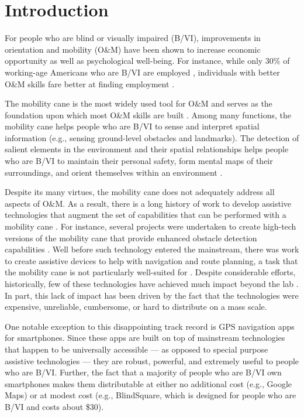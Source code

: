 \documentclass[chi_draft]{sigchi}
\newcommand{\BVI}{B/VI\xspace}
\newcommand{\OM}{O\&M\xspace}
\begin{document}
\section{Introduction}
For people who are blind or visually impaired (\BVI), improvements in orientation and mobility (\OM) have been shown to increase economic opportunity as well as psychological well-being.  For instance, while only 30\% of working-age Americans who are \BVI are employed \cite{employmentstatistics2017, kirchner1999looking}, individuals with better \OM skills fare better at finding employment \cite{crudden1998comprehensive, crudden1999barriers, leonard1999factors, o1999employment}.

The mobility cane is the most widely used tool for \OM and serves as the foundation upon which most \OM skills are built \cite{wiener2010foundations}.  Among many functions, the mobility cane helps people who are \BVI to sense and interpret spatial information (e.g., sensing ground-level obstacles and landmarks).  The detection of salient elements in the environment and their spatial relationships helps people who are \BVI to maintain their personal safety, form mental maps of their surroundings, and orient themselves within an environment \cite{thinus1997representation, schinazi2016spatial}.

Despite its many virtues, the mobility cane does not adequately address all aspects of \OM.  As a result, there is a long history of work to develop assistive technologies that augment the set of capabilities that can be performed with a mobility cane \cite{wiener2010foundations}.  For instance, several projects were undertaken to create high-tech versions of the mobility cane that provide enhanced obstacle detection capabilities \cite{benjamin1973new, borenstein1997guidecane}.  Well before such technology entered the mainstream, there was  work to create assistive devices to help with navigation and route planning, a task that the mobility cane is not particularly well-suited for \cite{dakopoulos2010wearable}.  Despite considerable efforts, historically, few of these technologies have achieved much impact beyond the lab \cite{wiener2010foundations}.  In part, this lack of impact has been driven by the fact that the technologies were expensive, unreliable, cumbersome, or hard to distribute on a mass scale.

One notable exception to this disappointing track record is GPS navigation apps for smartphones.  Since these apps are built on top of mainstream technologies that happen to be universally accessible --- as opposed to special purpose assistive technologies --- they are robust, powerful, and extremely useful to people who are \BVI.  Further, the fact that a majority of people who are \BVI own smartphones \cite{morris2014blind} makes them distributable at either no additional cost (e.g., Google Maps) or at modest cost (e.g., BlindSquare, which is designed for people who are \BVI and costs about \$30).
\end{document}
